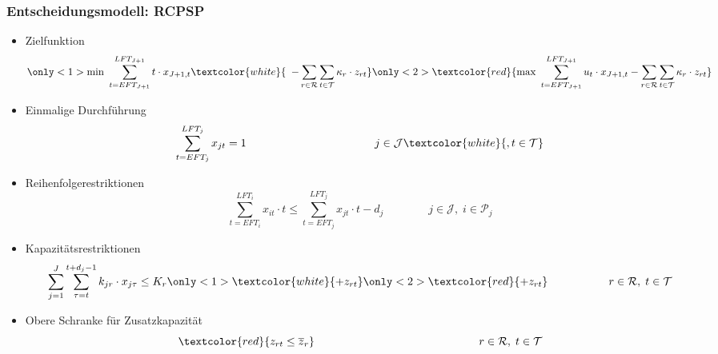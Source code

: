 \begin{frame}[noframenumbering]
\frametitle{Entscheidungsmodell: RCPSP}
\begin{footnotesize}
\begin{itemize}
\item Zielfunktion\\[-7mm]
\[
		\only<1>{\mbox{min } \sum_{t=EFT_{J+1}}^{LFT_{J+1}} t \cdot x_{{J+1},t} \textcolor{white}{\enspace - \sum_{r \in \mathcal{R}} \sum_{t \in \mathcal{T}} \kappa_r \cdot z_{rt}}}\only<2>{\textcolor{red}{\mbox{max } \sum_{t=EFT_{J+1}}^{LFT_{J+1}} u_t \cdot x_{{J+1},t} - \sum_{r \in \mathcal{R}} \sum_{t \in \mathcal{T}} \kappa_r \cdot z_{rt}}}
\]

\item Einmalige Durchführung
\[
\sum_{t=EFT_j}^{LFT_j} x_{jt} = 1 \,\,\,\quad\quad\quad\quad\quad\quad\quad\quad\quad\quad\quad j \in \mathcal{J}\textcolor{white}{, t \in \mathcal{T}}
\]

\item Reihenfolgerestriktionen
\[
\sum_{t=EFT_i}^{LFT_i} x_{it} \cdot t \leq \sum_{t=EFT_j}^{LFT_j} x_{jt} \cdot t - d_j \,\,\:\:\:\quad\quad\quad j \in \mathcal{J}, \; i \in \mathcal{P}_j
\]

\item Kapazitätsrestriktionen
\[
\sum_{j=1}^{J} \sum_{\tau=t}^{t+d_j-1} k_{jr} \cdot x_{j\tau} \leq K_r\only<1>{\textcolor{white}{ + z_{rt}}}\only<2>{ \textcolor{red}{+ z_{rt}}} \,\,\:\:\:\:\:\quad\quad\quad\quad r \in \mathcal{R}, \; t \in \mathcal{T}
\]

\item<2> Obere Schranke für Zusatzkapazität\\[-3mm]
\[
\textcolor{red}{z_{rt} \leq \overline{z}_r} \,\;\;\quad\quad\quad\quad\quad\quad\quad\quad\quad\quad\quad\quad\quad\quad r \in \mathcal{R}, \; t \in \mathcal{T}
\]
\end{itemize}
\end{footnotesize}
\end{frame}


